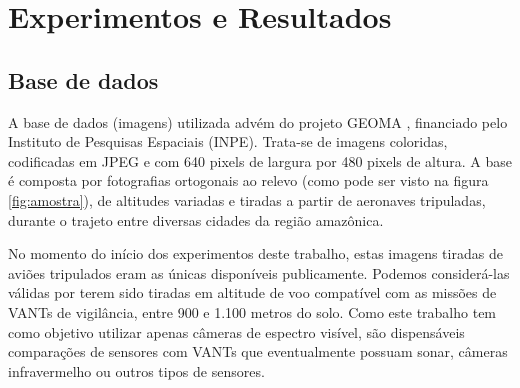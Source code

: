\chapter{Experimentos e Resultados}\label{cap:experimentos}

\section{Base de dados}

A base de dados (imagens) utilizada advém do projeto GEOMA \cite{geoma}, financiado pelo Instituto de Pesquisas Espaciais (INPE). Trata-se de imagens coloridas, codificadas em JPEG e com 640 pixels de largura por 480 pixels de altura. A base é composta por fotografias ortogonais ao relevo (como pode ser visto na figura \ref{fig:amostra}), de altitudes variadas e tiradas a partir de aeronaves tripuladas, durante o trajeto entre diversas cidades da região amazônica.

No momento do início dos experimentos deste trabalho, estas imagens tiradas de aviões tripulados eram as únicas disponíveis publicamente. Podemos considerá-las válidas por terem sido tiradas em altitude de voo compatível com as missões de VANTs de vigilância, entre 900 e 1.100 metros do solo. Como este trabalho tem como objetivo utilizar apenas câmeras de espectro visível, são dispensáveis comparações de sensores com VANTs que eventualmente possuam sonar, câmeras infravermelho ou outros tipos de sensores.

